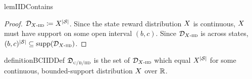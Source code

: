 \begin{restatable}{lem}{IIDContains}\label{lem:iid-contains}
\end{restatable}
\begin{proof}
$\Diid\defeq \Dist^{\abs{\St}}$. Since the state reward distribution $X$ is continuous, $X$ must have support on some open interval $(b,c)$. Since $\Diid$ is {\iid} across states, $(b,c)^{\abs{\St}}\subseteq \supp[\Diid]$.
\end{proof} 

\begin{restatable}{definition}{BCIIDDef}
$\mathfrak{D}_{\textsc{c/b/}\textsc{iid}}$ is the set of $\Diid$ which equal $X^{\left|\mathcal{S}\right|}$ for some continuous, bounded-support distribution $X$ over $\mathbb{R}$.
\end{restatable}
 
